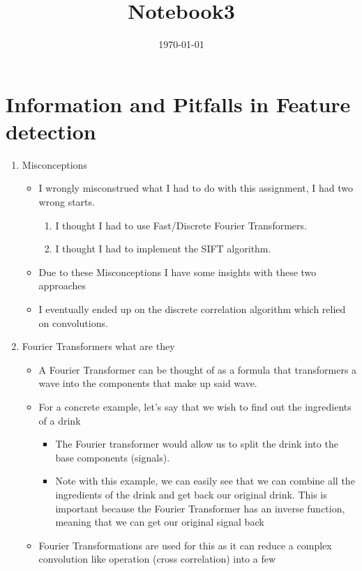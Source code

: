 \documentclass{article}
\date{\today}
\title{Notebook3}
\begin{document}
\maketitle
\tableofcontents

\section{Information and Pitfalls in Feature detection}
\label{sec-1}

\begin{enumerate}
\item Misconceptions
\label{sec-1-1}
\begin{itemize}
\item I wrongly misconstrued what Ι had to do with this assignment, I had
two wrong starts.
\begin{enumerate}
\item I thought Ι had to use Fast/Discrete Fourier Transformers.
\item I thought I had to implement the SIFT algorithm.
\end{enumerate}
\item Due to these Misconceptions I have some insights with these two approaches
\item I eventually ended up on the discrete correlation algorithm which
relied on convolutions.
\end{itemize}
\item Fourier Transformers what are they
\label{sec-1-2}
\begin{itemize}
\item A Fourier Transformer can be thought of as a formula that
transformers a wave into the components that make up said wave.
\item For a concrete example, let's say that we wish to find out the
ingredients of a drink
\begin{itemize}
\item The Fourier transformer would allow us to split the drink into the
base components (signals).
\item Note with this example, we can easily see that we can combine all
the ingredients of the drink and get back our original drink. This
is important because the Fourier Transformer has an inverse
function, meaning that we can get our original signal back
\end{itemize}
\item Fourier Transformations are used for this as it can reduce a
complex convolution like operation (cross correlation) into a few

\end{itemize}
\end{enumerate}
\end{document}
